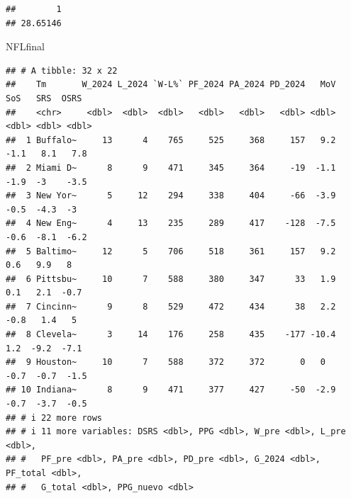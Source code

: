 \documentclass[
]{article}
\newenvironment{Shaded}{\begin{snugshade}}{\end{snugshade}}
\newcommand{\AttributeTok}[1]{\textcolor[rgb]{0.13,0.29,0.53}{#1}}
\newcommand{\CommentTok}[1]{\textcolor[rgb]{0.56,0.35,0.01}{\textit{#1}}}
\newcommand{\DecValTok}[1]{\textcolor[rgb]{0.00,0.00,0.81}{#1}}
\newcommand{\FunctionTok}[1]{\textcolor[rgb]{0.13,0.29,0.53}{\textbf{#1}}}
\newcommand{\NormalTok}[1]{#1}
\newcommand{\OtherTok}[1]{\textcolor[rgb]{0.56,0.35,0.01}{#1}}
\newcommand{\SpecialCharTok}[1]{\textcolor[rgb]{0.81,0.36,0.00}{\textbf{#1}}}
\newcommand{\StringTok}[1]{\textcolor[rgb]{0.31,0.60,0.02}{#1}}
\begin{document}
\begin{Shaded}
\end{Shaded}

\begin{verbatim}
##        1 
## 28.65146
\end{verbatim}

\begin{Shaded}
\begin{Highlighting}[]
\NormalTok{NFLfinal}
\end{Highlighting}
\end{Shaded}

\begin{verbatim}
## # A tibble: 32 x 22
##    Tm       W_2024 L_2024 `W-L%` PF_2024 PA_2024 PD_2024   MoV   SoS   SRS  OSRS
##    <chr>     <dbl>  <dbl>  <dbl>   <dbl>   <dbl>   <dbl> <dbl> <dbl> <dbl> <dbl>
##  1 Buffalo~     13      4    765     525     368     157   9.2  -1.1   8.1   7.8
##  2 Miami D~      8      9    471     345     364     -19  -1.1  -1.9  -3    -3.5
##  3 New Yor~      5     12    294     338     404     -66  -3.9  -0.5  -4.3  -3  
##  4 New Eng~      4     13    235     289     417    -128  -7.5  -0.6  -8.1  -6.2
##  5 Baltimo~     12      5    706     518     361     157   9.2   0.6   9.9   8  
##  6 Pittsbu~     10      7    588     380     347      33   1.9   0.1   2.1  -0.7
##  7 Cincinn~      9      8    529     472     434      38   2.2  -0.8   1.4   5  
##  8 Clevela~      3     14    176     258     435    -177 -10.4   1.2  -9.2  -7.1
##  9 Houston~     10      7    588     372     372       0   0    -0.7  -0.7  -1.5
## 10 Indiana~      8      9    471     377     427     -50  -2.9  -0.7  -3.7  -0.5
## # i 22 more rows
## # i 11 more variables: DSRS <dbl>, PPG <dbl>, W_pre <dbl>, L_pre <dbl>,
## #   PF_pre <dbl>, PA_pre <dbl>, PD_pre <dbl>, G_2024 <dbl>, PF_total <dbl>,
## #   G_total <dbl>, PPG_nuevo <dbl>
\end{verbatim}
\end{document}
